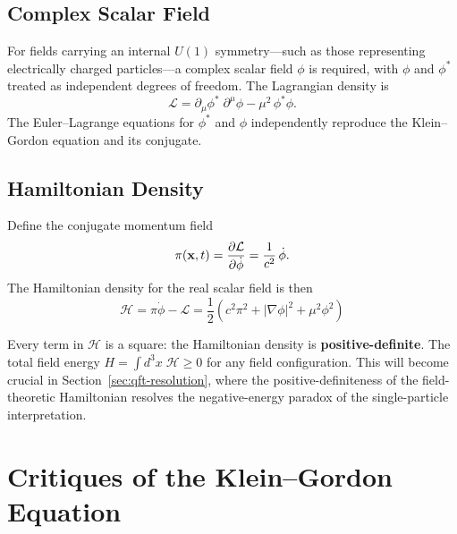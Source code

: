 \documentclass[12pt, a4paper]{article}
\theoremstyle{definition}
\begin{document}
\subsection{Complex Scalar Field}

For fields carrying an internal $U(1)$ symmetry---such as those representing
electrically charged particles---a complex scalar field $\phi$ is required,
with $\phi$ and $\phi^{*}$ treated as independent degrees of freedom.  The
Lagrangian density is
\begin{equation}\label{eq:lagrangian-complex}
    \mathcal{L}
    = \partial_{\mu}\phi^{*}\;\partial^{\mu}\phi
    - \mu^{2}\,\phi^{*}\phi.
\end{equation}
The Euler--Lagrange equations for $\phi^{*}$ and $\phi$ independently
reproduce the Klein--Gordon equation and its conjugate.

\subsection{Hamiltonian Density}

Define the conjugate momentum field
\begin{equation}
    \pi(\vb{x},t)
    = \frac{\partial\mathcal{L}}{\partial\dot{\phi}}
    = \frac{1}{c^{2}}\,\dot{\phi}.
\end{equation}
The Hamiltonian density for the real scalar field is then
\begin{equation}\label{eq:hamiltonian-density}
    \boxed{\;
    \mathcal{H}
    = \pi\dot\phi - \mathcal{L}
    = \frac{1}{2}\left(
      c^{2}\pi^{2} + |\nabla\phi|^{2} + \mu^{2}\phi^{2}
    \right)
    \;}
\end{equation}

\begin{warning}
Every term in $\mathcal{H}$ is a square: the Hamiltonian density is
\textbf{positive-definite}.  The total field energy
$H = \int d^{3}x\;\mathcal{H} \geq 0$ for any field configuration.  This
will become crucial in Section~\ref{sec:qft-resolution}, where the
positive-definiteness of the field-theoretic Hamiltonian resolves the
negative-energy paradox of the single-particle interpretation.
\end{warning}

\section{Critiques of the Klein--Gordon Equation}
\label{sec:critiques}
\end{document}
